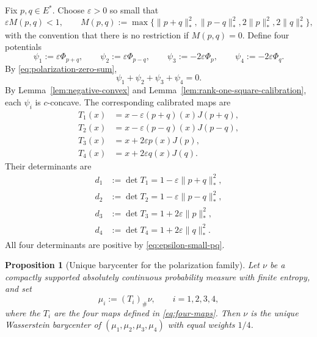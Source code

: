\documentclass[10pt,a4paper]{amsart}
\numberwithin{equation}{section}
\newtheorem{proposition}[theorem]{Proposition}
\begin{document}
	Fix \(p,q\in E^*\). Choose \(\varepsilon>0\) so small that
	\begin{equation}\label{eq:epsilon-small-pq}
		\varepsilon M(p,q)<1,
		\qquad
		M(p,q):=\max\{\|p+q\|_*^2,\|p-q\|_*^2,2\|p\|_*^2,2\|q\|_*^2\},
	\end{equation}
	with the convention that there is no restriction if \(M(p,q)=0\). Define four potentials
	\begin{equation}\label{eq:polarization-potentials}
		\psi_1:=\varepsilon\Phi_{p+q},
		\qquad
		\psi_2:=\varepsilon\Phi_{p-q},
		\qquad
		\psi_3:=-2\varepsilon\Phi_p,
		\qquad
		\psi_4:=-2\varepsilon\Phi_q.
	\end{equation}
	By \eqref{eq:polarization-zero-sum},
	\begin{equation}\label{eq:four-zero-sum}
		\psi_1+\psi_2+\psi_3+\psi_4=0.
	\end{equation}
	By Lemma~\ref{lem:negative-convex} and Lemma~\ref{lem:rank-one-square-calibration}, each \(\psi_i\) is \(c\)-concave. The
	corresponding calibrated maps are
	\begin{equation}\label{eq:four-maps}
		\begin{aligned}
			T_1(x)&=x-\varepsilon(p+q)(x)J(p+q),\\
			T_2(x)&=x-\varepsilon(p-q)(x)J(p-q),\\
			T_3(x)&=x+2\varepsilon p(x)J(p),\\
			T_4(x)&=x+2\varepsilon q(x)J(q).
		\end{aligned}
	\end{equation}
	Their determinants are
	\begin{equation}\label{eq:four-determinants}
		\begin{aligned}
			d_1&:=\det T_1=1-\varepsilon\|p+q\|_*^2,\\
			d_2&:=\det T_2=1-\varepsilon\|p-q\|_*^2,\\
			d_3&:=\det T_3=1+2\varepsilon\|p\|_*^2,\\
			d_4&:=\det T_4=1+2\varepsilon\|q\|_*^2.
		\end{aligned}
	\end{equation}
	All four determinants are positive by \eqref{eq:epsilon-small-pq}.
	
	
	
	\begin{proposition}[Unique barycenter for the polarization family]
		\label{prop:polarization-unique-barycenter}
		Let \(\nu\) be a compactly supported absolutely continuous probability measure with finite
		entropy, and set
		\[
		\mu_i:=(T_i)_\#\nu,
		\qquad i=1,2,3,4,
		\]
		where the \(T_i\) are the four maps defined in
		\eqref{eq:four-maps}. Then \(\nu\) is the
		unique Wasserstein barycenter of
		\((\mu_1,\mu_2,\mu_3,\mu_4)\) with equal weights \(1/4\).
	\end{proposition}
	
\end{document}
